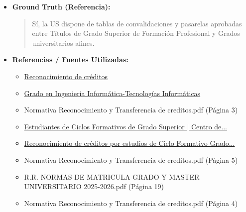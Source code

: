 \documentclass[12pt,a4paper,oneside]{report}
\begin{document}
\begin{itemize}
\begin{itemize}
\begin{quote}
En resumen, los créditos del Ciclo Formativo de Grado Superior (CFGS) pueden ser convalidados en un Grado universitario, siempre que se cumplan los requisitos establecidos en la normativa de la Universidad de Sevilla y se presenten dentro del plazo establecido.

Te recomiendo verificar la información actualizada en la página web oficial de la Universidad de Sevilla o contactar directamente con el Centro de Atención a Estudiantes para obtener más detalles sobre el proceso de reconocimiento de créditos.
                \end{quote}
          \item \textbf{{Ground Truth (Referencia):}} \\
                \begin{quote}
Sí, la US dispone de tablas de convalidaciones y pasarelas aprobadas entre Títulos de Grado Superior de Formación Profesional y Grados universitarios afines.
                \end{quote}
          \item \textbf{{Referencias / Fuentes Utilizadas:}} \\
                \begin{itemize}
                  \item \href{https://www.informatica.us.es/index.php/secretaria/rec-creditos}{Reconocimiento de créditos}
                  \item \href{https://www.us.es/estudiar/que-estudiar/oferta-de-grados/grado-en-ingenieria-informatica-tecnologias-informaticas}{Grado en Ingeniería Informática-Tecnologías Informáticas}
                  \item Normativa Reconocimiento y Transferencia de creditos.pdf (Página 3)
                  \item \href{https://cat.us.es/acceso-y-admision/admision-preinscripcion/grado/estudiantes-de-ciclos-formativos-de-grado-superior}{Estudiantes de Ciclos Formativos de Grado Superior | Centro de...}
                  \item \href{https://www.eii.us.es/index.php/secretaria/rec-creditos/rec-creditos-estudios-de-ciclo-formativo-grado-superior}{Reconocimiento de créditos por estudios de Ciclo Formativo Grado...}
                  \item Normativa Reconocimiento y Transferencia de creditos.pdf (Página 5)
                  \item R.R. NORMAS DE MATRICULA GRADO Y MASTER UNIVERSITARIO 2025-2026.pdf (Página 19)
                  \item Normativa Reconocimiento y Transferencia de creditos.pdf (Página 4)
                \end{itemize}
        \end{itemize}


\end{itemize}
\end{document}
